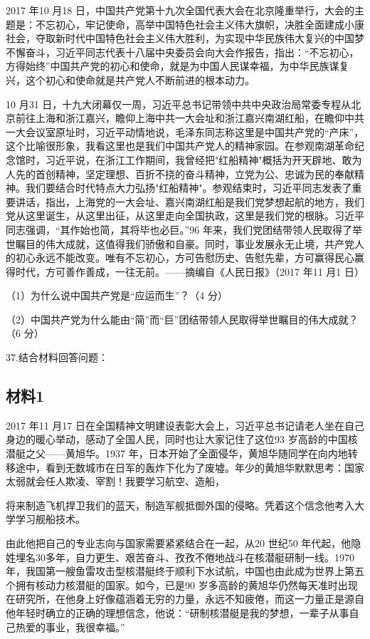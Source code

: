\documentclass[UTF8,11pt]{ctexart}
\begin{document}
2017 年10 月18 日，中国共产党第十九次全国代表大会在北京隆重举行，大会的主题是：不忘初心，牢记使命，高举中国特色社会主义伟大旗帜，决胜全面建成小康社会，夺取新时代中国特色社会主义伟大胜利，为实现中华民族伟大复兴的中国梦不懈奋斗，习近平同志代表十八届中央委员会向大会作报告，指出：“不忘初心，方得始终”中国共产党的初心和使命，就是为中国人民谋幸福，为中华民族谋复兴，这个初心和使命就是共产党人不断前进的根本动力。

10 月31 日，十九大闭幕仅一周，习近平总书记带领中共中央政治局常委专程从北京前往上海和浙江嘉兴，瞻仰上海中共一大会址和浙江嘉兴南湖红船，在瞻仰中共一大会议室原址时，习近平动情地说，毛泽东同志称这里是中国共产党的“产床”，这个比喻很形象，我看这里也是我们中国共产党人的精神家园。在参观南湖革命纪念馆时，习近平说，在浙江工作期间，我曾经把"红船精神"概括为开天辟地、敢为人先的首创精神，坚定理想、百折不挠的奋斗精神，立党为公、忠诚为民的奉献精神。我们要结合时代特点大力弘扬"红船精神"。参观结束时，习近平同志发表了重要讲话，指出，上海党的一大会址、嘉兴南湖红船是我们党梦想起航的地方，我们党从这里诞生，从这里出征，从这里走向全国执政，这里是我们党的根脉。习近平同志强调，“其作始也简，其将毕也必巨。”96 年来，我们党团结带领人民取得了举世瞩目的伟大成就，这值得我们骄傲和自豪。同时，事业发展永无止境，共产党人的初心永远不能改变。唯有不忘初心，方可告慰历史、告慰先辈，方可赢得民心赢得时代，方可善作善成，一往无前。——摘编自《人民日报》（2017 年11 月1 日）

（1）为什么说中国共产党是“应运而生”？（4 分）


（2）中国共产党为什么能由“简”而“巨”团结带领人民取得举世瞩目的伟大成就？（6 分）


37.结合材料回答问题：


\subsection*{材料1}

2017 年11 月17 日在全国精神文明建设表彰大会上，习近平总书记请老人坐在自己身边的暖心举动，感动了全国人民，同时也让大家记住了这位93 岁高龄的中国核潜艇之父——黄旭华。1937 年，日本开始了全面侵华，黄旭华随同学在向内地转移途中，看到无数城市在日军的轰炸下化为了废墟。年少的黄旭华默默思考：国家太弱就会任人欺凌、宰割！我要学习航空、造船，


将来制造飞机捍卫我们的蓝天，制造军舰抵御外国的侵略。凭着这个信念他考入大学学习舰船技术。

由此他把自己的专业志向与国家需要紧紧结合在一起，从20 世纪50 年代起，他隐姓埋名30多年，自力更生、艰苦奋斗、孜孜不倦地战斗在核潜艇研制一线。1970 年，我国第一艘鱼雷攻击型核潜艇终于顺利下水试航，中国也由此成为世界上第五个拥有核动力核潜艇的国家。如今，已是90 岁多高龄的黄旭华仍然每天准时出现在研究所，在他身上好像蕴涵着无穷的力量，永远不知疲倦，而这一力量正是源自他年轻时确立的正确的理想信念，他说：“研制核潜艇是我的梦想，一辈子从事自己热爱的事业，我很幸福。”
\end{document}
